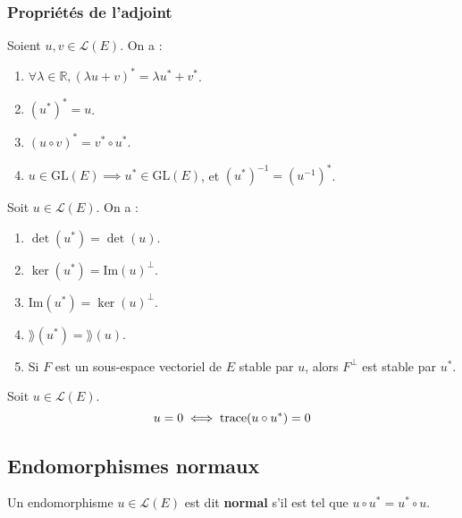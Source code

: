   \subsubsection{Propriétés de l'adjoint}


  \begin{proposition}
    \label{158-1}
    Soient $u, v \in \mathcal{L}(E)$. On a :
    \begin{enumerate}[label=(\roman*)]
      \item $\forall \lambda \in \mathbb{R}, (\lambda u + v)^* = \lambda u^* + v^*$.
      \item $(u^*)^* = u$.
      \item $(u \circ v)^* = v^* \circ u^*$.
      \item $u \in \mathrm{GL}(E) \implies u^* \in \mathrm{GL}(E)$, et $(u^*)^{-1} = (u^{-1})^*$.
    \end{enumerate}
  \end{proposition}

  \begin{proposition}
    Soit $u \in \mathcal{L}(E)$. On a :
    \begin{enumerate}[label=(\roman*)]
      \item $\det(u^*) = \det(u)$.
      \item $\ker(u^*) = \mathrm{Im}(u)^\perp$.
      \item $\mathrm{Im}(u^*) = \ker(u)^\perp$.
      \item $\rang(u^*) = \rang(u)$.
      \item Si $F$ est un sous-espace vectoriel de $E$ stable par $u$, alors $F^\perp$ est stable par $u^*$.
    \end{enumerate}
  \end{proposition}


  \begin{proposition}
    Soit $u \in \mathcal{L}(E)$.
    \[ u = 0 \iff \operatorname{trace}(u \circ u^*) = 0 \]
  \end{proposition}

  \subsection{Endomorphismes normaux}


  \begin{definition}
    Un endomorphisme $u \in \mathcal{L}(E)$ est dit \textbf{normal} s'il est tel que $u \circ u^* = u^* \circ u$.
  \end{definition}

